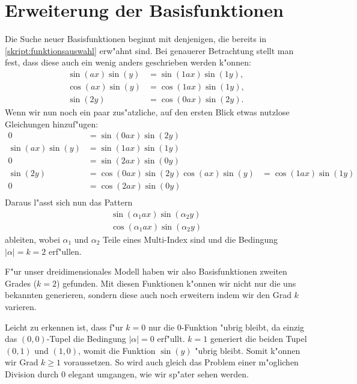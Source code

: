 \section{Erweiterung der Basisfunktionen\label{section:lorenz2:basic_function}}
Die Suche neuer Basisfunktionen beginnt mit denjenigen, die bereits 
in \cref{skript:funktionsauswahl} erw"ahnt sind. Bei genauerer Betrachtung 
stellt man fest, dass diese auch ein wenig anders geschrieben werden k"onnen:
\begin{align*}
\sin(ax)\sin(y) &= \sin(1ax)\sin(1y),\\
\cos(ax)\sin(y) &= \cos(1ax)\sin(1y),\\
\sin(2y) &= \cos(0ax)\sin(2y).
\end{align*}
Wenn wir nun noch ein paar zus"atzliche, auf den ersten Blick etwas nutzlose 
Gleichungen hinzuf"ugen:
\begin{align*}
0 &= \sin(0ax)\sin(2y) \\
\sin(ax)\sin(y) &= \sin(1ax)\sin(1y)\\
0 &= \sin(2ax)\sin(0y) \\
\sin(2y) &= \cos(0ax)\sin(2y)
\cos(ax)\sin(y) &= \cos(1ax)\sin(1y)\\
0 &= \cos(2ax)\sin(0y)\\
\end{align*}
Daraus l"asst sich nun das Pattern
\begin{equation}
\begin{split}
\sin(\alpha_1 ax)\sin(\alpha_2 y) \\
\cos(\alpha_1 ax)\sin(\alpha_2 y)
\end{split}
\label{equation:lorenz2:basic-functions}
\end{equation}
ableiten, wobei $\alpha_1$ und $\alpha_2$ Teile eines Multi-Index sind und die 
Bedingung $|\alpha| = k = 2$ erf"ullen.

F"ur unser dreidimensionales Modell haben wir also Basisfunktionen zweiten 
Grades ($k = 2$) gefunden. Mit diesen Funktionen k"onnen wir nicht nur die uns 
bekannten generieren, sondern diese auch noch erweitern indem wir den Grad $k$ 
varieren.

Leicht zu erkennen ist, dass f"ur $k = 0$ nur die $0$-Funktion 
"ubrig bleibt, da einzig das $(0, 0)$-Tupel die Bedingung $|\alpha| = 0$ 
erf"ullt. $k = 1$ generiert die beiden Tupel $(0, 1)$ und $(1, 0)$, womit die 
Funktion $\sin(y)$ "ubrig bleibt. Somit k"onnen wir Grad $k \geq 1$ 
voraussetzen. So wird auch gleich das Problem einer m"oglichen Division durch 
$0$ elegant umgangen, wie wir sp"ater sehen werden.
